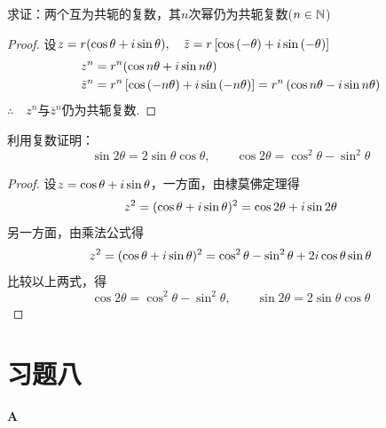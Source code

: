\begin{example}
    求证：两个互为共轭的复数，其$n$次幂仍为共轭复数($n\in\mathbb{N}$)
\end{example}

\begin{proof}
设$z=r(\cos\theta+i\sin\theta),\quad \bar z=r\left[\cos\left(-\theta\right)+i\sin\left(-\theta\right)\right]$
\[\begin{split}
    z^n&=r^n(\cos n\theta+i\sin n\theta)\\
\bar z^n&=r^n\left[\cos\left(-n\theta\right)+i\sin\left(-n\theta\right)\right]=r^n\left(\cos n\theta-i\sin n\theta\right)
\end{split}\]
$\therefore\quad z^n$与$\bar z^{n}$仍为共轭复数.
\end{proof}

\begin{example}
利用复数证明：
\[\sin2\theta=2\sin\theta\cos\theta,\qquad \cos2\theta=\cos^2\theta-\sin^2\theta\]
\end{example}

\begin{proof}
设$z=\cos\theta+i\sin\theta$，一方面，由棣莫佛定理得
\[z^2=(\cos\theta+i\sin\theta)^2=\cos2\theta+i\sin2\theta\]
另一方面，由乘法公式得
    \[z^2=(\cos\theta+i\sin\theta)^2=\cos^2\theta-\sin^2\theta+2i\cos\theta\sin\theta\]
    比较以上两式，得
    \[\cos2\theta=\cos^2\theta-\sin^2\theta,\qquad \sin2\theta=2\sin\theta\cos\theta\]
\end{proof}

\section*{习题八}
\begin{center}
    \bfseries A
\end{center}

